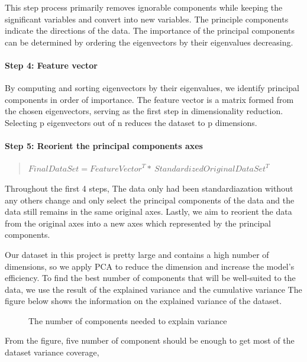 This step process primarily removes ignorable components while keeping the significant variables and convert into new variables. The principle components indicate the directions of the data.
The importance of the principal components can be determined by ordering the eigenvectors by their eigenvalues decreasing.

\paragraph*{Step 4: Feature vector}
By computing and sorting eigenvectors by their eigenvalues, we identify principal components in order of importance. The feature vector is a matrix formed from the chosen eigenvectors, serving as the first step in dimensionality reduction. Selecting p eigenvectors out of n reduces the dataset to p dimensions. 

\paragraph*{Step 5: Reorient the principal components axes}

\begin{quote}
    \(FinalDataSet = {FeatureVector}^{T}*\ {StandardizedOriginalDataSet}^{T}\)
\end{quote}
Throughout the first 4 steps, The data only had been standardiazation without any others change and only select the principal components of the data and the data still remains in the same original axes.
Lastly, we aim to reorient the data from the original axes into a new axes which represented by the principal components.

Our dataset in this project is pretty large and contains a high number of dimensions, so we apply PCA to reduce the dimension and increase the model’s efficiency. To find the best number of components that will be well-suited to the data, we use the result of the explained variance and the cumulative variance The figure below shows the information on the explained variance of the dataset. 


\begin{figure}[h]
    \centering
    \caption{The number of components needed to explain variance
    } \label{fig:no-component-variance}
\end{figure}
From the figure, five number of component should be enough to get most of the dataset variance coverage, 
